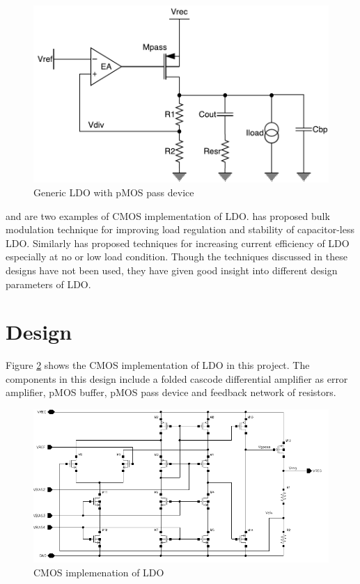 \documentclass[UKenglish]{ifimaster}  %
\begin{document}
\begin{figure}[htbp] %
   \centering
   \includegraphics[width=\textwidth]{img/ldo.pdf} 
   \caption{Generic LDO with pMOS pass device}
   \label{ldo_gen}
\end{figure}

\cite{ldo_bulkmod} and \cite{ldo_quiescent} are two examples of CMOS implementation of LDO. \cite{ldo_bulkmod} 
has proposed bulk modulation technique for improving load regulation and stability of capacitor-less LDO. 
Similarly \cite{ldo_quiescent} has  proposed techniques for increasing current efficiency of LDO especially at 
no or low load condition. Though the techniques discussed in these designs have not been used, they have given 
good insight into different design parameters of LDO.  \\

\section{Design}		%

Figure \ref{ldo_cmos} shows the CMOS implementation of LDO in this project. The components in this design 
include a folded cascode differential amplifier as error amplifier, pMOS buffer, pMOS pass device and feedback 
network of resistors. \\

\begin{figure}[htbp] %
   \centering
  \includegraphics[width=\textwidth]{img/ldo_schematic.pdf} 
   \caption{CMOS implemenation of LDO}
   \label{ldo_cmos}
\end{figure}
\end{document}
